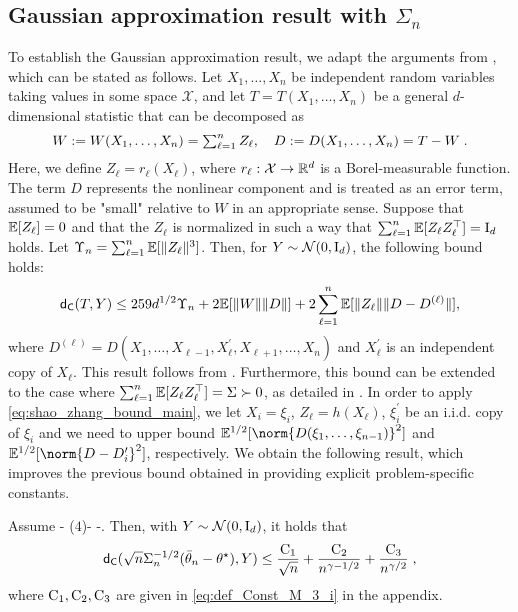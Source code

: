 \subsection{Gaussian approximation result with $\Sigma_n$}
\label{sec:shao_self-normalized}
To establish the Gaussian approximation result, we adapt the arguments from \cite{shao2022berry}, which can be stated as follows. Let \( X_1, \ldots, X_n \) be independent random variables taking values in some space \( \mathcal{X} \), and let \( T = T(X_1, \ldots, X_n) \) be a general \( d \)-dimensional statistic that can be decomposed as  
\begin{equation}
\label{eq:W-D-decomposition} 
\textstyle 
W := W(X_1,\ldots,X_n) = \sum_{\ell = 1}^n Z_\ell, \quad D := D(X_1, \ldots, X_n) = T - W\;.
\end{equation}
Here, we define \( Z_\ell = r_\ell(X_\ell) \), where \( r_\ell: \mathcal{X} \to \mathbb{R}^d \) is a Borel-measurable function. The term \( D \) represents the nonlinear component and is treated as an error term, assumed to be "small" relative to \( W \) in an appropriate sense.  
Suppose that \( \mathbb{E}[Z_\ell] = 0 \) and that the $Z_{\ell}$ is normalized in such a way that \( \sum_{\ell=1}^n \mathbb{E}[Z_\ell Z_\ell^\top] = \mathrm{I}_d \) holds. Let   $\Upsilon_n = \sum_{\ell=1}^n \mathbb{E}[\|Z_\ell\|^3]$. Then, for \( Y \sim \mathcal{N}(0,\mathrm{I}_d) \), the following bound holds:
\begin{equation}
\label{eq:shao_zhang_bound_main}
\mathsf{d}_{\mathsf{C}}(T, Y) \leq 259 d^{1/2} \Upsilon_{n} + 2 \mathbb{E}[\|W\| \|D\|] + 2 \sum_{\ell=1}^n \mathbb{E}[\|Z_\ell\| \|D - D^{(\ell)}\|],
\end{equation}
where \( D^{(\ell)} = D(X_1, \ldots, X_{\ell-1}, X_{\ell}^{\prime}, X_{\ell+1}, \ldots, X_n) \) and \( X_\ell^{\prime} \) is an independent copy of \( X_\ell \). This result follows from \cite[Theorem~2.1]{shao2022berry}. Furthermore, this bound can be extended to the case where \( \sum_{\ell=1}^n \mathbb{E}[Z_\ell Z_\ell^\top] = \Sigma \succ 0 \), as detailed in \cite[Corollary~2.3]{shao2022berry}. In order to apply \eqref{eq:shao_zhang_bound_main}, we let $X_i = \xi_i$, $Z_{\ell} = h(X_{\ell})$, $\xi_{i}^{\prime}$ be an i.i.d. copy of $\xi_i$ and we need to upper bound $\PE^{1/2}[\norm{D(\xi_1,\ldots,\xi_{n-1})}^2]$ and $\PE^{1/2}[\norm{D - D_{i}^{\prime}}^2]$, respectively. We obtain the following result, which improves the previous bound obtained in \cite[Theorem~3.4] {shao2022berry} providing explicit problem-specific constants.
\begin{theorem}    
\label{th:bound_kolmogorov_dist_pr_sigma_n}
Assume  - ($4$)- -. Then, with $Y \sim \mathcal{N}(0,\mathrm{I}_d)$, it holds that 
\begin{equation}
\label{eq:kolm-dist}
\mathsf{d}_{\mathsf{C}}(\sqrt{n} \Sigma_{n}^{-1/2}(\bar\theta_n -\theta^\star), Y) \leq \frac{\operatorname{C}_1}{\sqrt{n}}   +  \frac{\operatorname{C}_2}{n^{\gamma - 1/2}}+ \frac{\operatorname{C}_3}{n^{\gamma/2}}\;,
\end{equation}
where $\operatorname{C}_1, \operatorname{C}_2, \operatorname{C}_3$ are given in \eqref{eq:def_Const_M_3_i} in the appendix.
\end{theorem}
